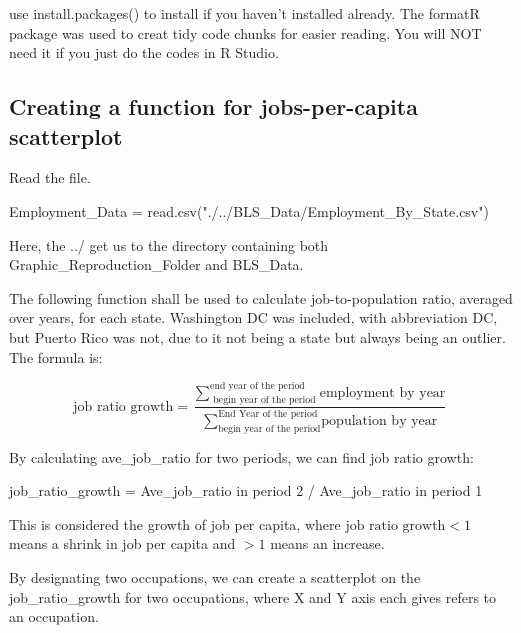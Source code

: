 \documentclass[
]{article}
\newenvironment{Shaded}{\begin{snugshade}}{\end{snugshade}}
\newcommand{\FunctionTok}[1]{\textcolor[rgb]{0.00,0.00,0.00}{#1}}
\newcommand{\NormalTok}[1]{#1}
\newcommand{\OtherTok}[1]{\textcolor[rgb]{0.56,0.35,0.01}{#1}}
\newcommand{\StringTok}[1]{\textcolor[rgb]{0.31,0.60,0.02}{#1}}
\begin{document}
use install.packages() to install if you haven't installed already. The
formatR package was used to creat tidy code chunks for easier reading.
You will NOT need it if you just do the codes in R Studio.

\hypertarget{creating-a-function-for-jobs-per-capita-scatterplot}{%
\subsection{Creating a function for jobs-per-capita
scatterplot}\label{creating-a-function-for-jobs-per-capita-scatterplot}}

Read the file.

\begin{Shaded}
\begin{Highlighting}[]
\NormalTok{Employment\_Data }\OtherTok{=} \FunctionTok{read.csv}\NormalTok{(}\StringTok{"./../BLS\_Data/Employment\_By\_State.csv"}\NormalTok{)}
\end{Highlighting}
\end{Shaded}

Here, the ../ get us to the directory containing both
Graphic\_Reproduction\_Folder and BLS\_Data.

The following function shall be used to calculate job-to-population
ratio, averaged over years, for each state. Washington DC was included,
with abbreviation DC, but Puerto Rico was not, due to it not being a
state but always being an outlier. The formula is:

\begin{center}
$$\text{job ratio growth} = \displaystyle \frac{\displaystyle \sum _{\text{ begin year of the period }} ^{\text{end year of the period}} \text{employment by year}} {\displaystyle \sum _{\text {begin year of the period}} ^{\text {End Year of the period}} \text{population by year}}$$
\end{center}

By calculating ave\_job\_ratio for two periods, we can find job ratio
growth:

job\_ratio\_growth = Ave\_job\_ratio in period 2 / Ave\_job\_ratio in
period 1

This is considered the growth of job per capita, where
\(\text{job ratio growth} < 1\) means a shrink in job per capita and
\(>1\) means an increase.

By designating two occupations, we can create a scatterplot on the
job\_ratio\_growth for two occupations, where X and Y axis each gives
refers to an occupation.
\end{document}
